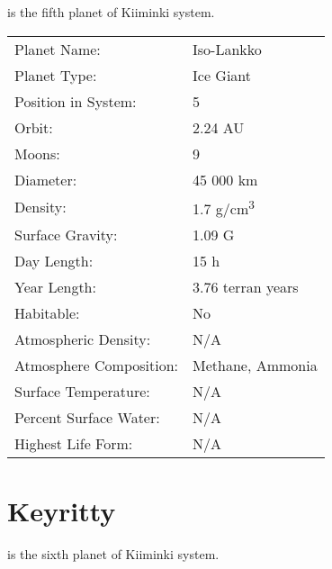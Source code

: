 \documentclass{tufte-book}
\begin{document}
 is the fifth planet of Kiiminki system.

\bigskip
\begin{minipage}{\textwidth}
\begin{center}
\begin{tabular}{ll}
\toprule
Planet Name: & Iso-Lankko \\
Planet Type: & Ice Giant \\
Position in System: & 5 \\
Orbit: & 2.24 AU \\
Moons: & 9 \\
Diameter: & 45 000 km \\
Density: & 1.7 g/cm\textsuperscript{3} \\
Surface Gravity: & 1.09 G \\
Day Length: & 15 h \\
Year Length: & 3.76 terran years \\
Habitable: & No \\
\quad Atmospheric Density: & N/A \\
\quad Atmosphere Composition: & Methane, Ammonia \\
\quad Surface Temperature: & N/A \\
\quad Percent Surface Water: & N/A \\
\quad Highest Life Form: & N/A \\

\bottomrule
\end{tabular}
\end{center}
\end{minipage}


\section{Keyritty}

 is the sixth planet of Kiiminki system.
\end{document}
